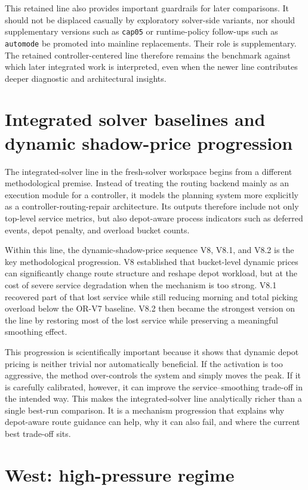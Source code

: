 This retained line also provides important guardrails for later comparisons. It should not be displaced casually by exploratory solver-side variants, nor should supplementary versions such as \texttt{cap05} or runtime-policy follow-ups such as \texttt{automode} be promoted into mainline replacements. Their role is supplementary. The retained controller-centered line therefore remains the benchmark against which later integrated work is interpreted, even when the newer line contributes deeper diagnostic and architectural insights.

\section{Integrated solver baselines and dynamic shadow-price progression}

The integrated-solver line in the fresh-solver workspace begins from a different methodological premise. Instead of treating the routing backend mainly as an execution module for a controller, it models the planning system more explicitly as a controller-routing-repair architecture. Its outputs therefore include not only top-level service metrics, but also depot-aware process indicators such as deferred events, depot penalty, and overload bucket counts.

Within this line, the dynamic-shadow-price sequence V8, V8.1, and V8.2 is the key methodological progression. V8 established that bucket-level dynamic prices can significantly change route structure and reshape depot workload, but at the cost of severe service degradation when the mechanism is too strong. V8.1 recovered part of that lost service while still reducing morning and total picking overload below the OR-V7 baseline. V8.2 then became the strongest version on the line by restoring most of the lost service while preserving a meaningful smoothing effect.

This progression is scientifically important because it shows that dynamic depot pricing is neither trivial nor automatically beneficial. If the activation is too aggressive, the method over-controls the system and simply moves the peak. If it is carefully calibrated, however, it can improve the service--smoothing trade-off in the intended way. This makes the integrated-solver line analytically richer than a single best-run comparison. It is a mechanism progression that explains why depot-aware route guidance can help, why it can also fail, and where the current best trade-off sits.

\section{West: high-pressure regime}

